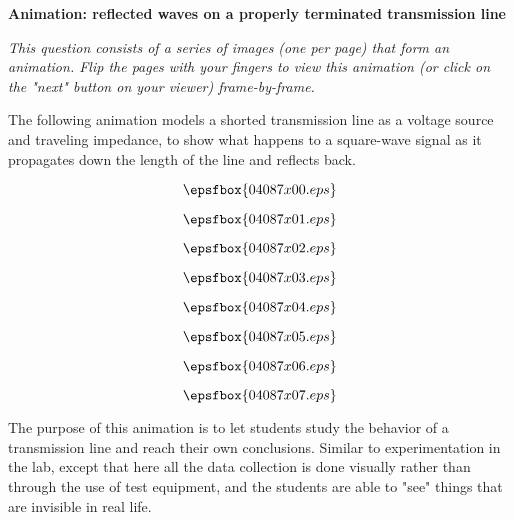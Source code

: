 

\centerline{\bf Animation: reflected waves on a properly terminated transmission line}

\vskip 10pt

{\it This question consists of a series of images (one per page) that form an animation.  Flip the pages with your fingers to view this animation (or click on the "next" button on your viewer) frame-by-frame.}

\vskip 10pt

The following animation models a shorted transmission line as a voltage source and traveling impedance, to show what happens to a square-wave signal as it propagates down the length of the line and reflects back.

\vfil \eject
$$\epsfbox{04087x00.eps}$$

\vfil \eject
$$\epsfbox{04087x01.eps}$$

\vfil \eject
$$\epsfbox{04087x02.eps}$$

\vfil \eject
$$\epsfbox{04087x03.eps}$$

\vfil \eject
$$\epsfbox{04087x04.eps}$$

\vfil \eject
$$\epsfbox{04087x05.eps}$$

\vfil \eject
$$\epsfbox{04087x06.eps}$$

\vfil \eject
$$\epsfbox{04087x07.eps}$$


\vfil \eject














The purpose of this animation is to let students study the behavior of a transmission line and reach their own conclusions.  Similar to experimentation in the lab, except that here all the data collection is done visually rather than through the use of test equipment, and the students are able to "see" things that are invisible in real life.




